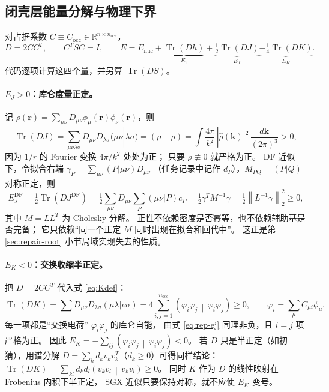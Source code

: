 \documentclass[UTF8,fontset=fandol,11pt,a4paper]{ctexart}
\numberwithin{equation}{section}
\newcommand{\Tr}{\operatorname{Tr}}
\newcommand{\norm}[1]{\left\lVert #1\right\rVert}
\newcommand{\inner}[2]{\left(#1\,\middle|\,#2\right)}
\begin{document}
\subsection{闭壳层能量分解与物理下界}
\label{sec:repair-energy}
对占据系数 \(C\equiv C_{\mathrm{occ}}\in\mathbb R^{n\times n_{\mathrm{occ}}}\)，
\begin{equation}
D=2CC^T,\qquad C^TSC=I,\qquad
E=E_{\mathrm{nuc}}+\underbrace{\Tr(Dh)}_{E_1}
+\underbrace{\tfrac12\Tr(DJ)}_{E_J}
\underbrace{-\tfrac14\Tr(DK)}_{E_K}.
\label{eq:rep-energy}
\end{equation}
代码逐项计算这四个量，并另算 \(\Tr(DS)\)。

\paragraph{\(E_J>0\)：库仑度量正定。}
记 \(\rho(\bm r)=\sum_{\mu\nu}D_{\mu\nu}\phi_\mu(\bm r)\phi_\nu(\bm r)\)，则
\begin{equation}
\Tr(DJ)=\sum_{\mu\nu\lambda\sigma}D_{\mu\nu}D_{\lambda\sigma}(\mu\nu|\lambda\sigma)
=\inner{\rho}{\rho}
=\int\frac{4\pi}{k^2}\,|\hat\rho(\bm k)|^2\,\frac{d\bm k}{(2\pi)^3}>0,
\label{eq:rep-ej}
\end{equation}
因为 \(1/r\) 的 Fourier 变换 \(4\pi/k^2\) 处处为正；
只要 \(\rho\not\equiv0\) 就严格为正。
DF 近似下，令拟合右端
\(\gamma_P=\sum_{\mu\nu}(P|\mu\nu)D_{\mu\nu}\)
（任务记录中记作 \(d_P\)），\(M_{PQ}=(P|Q)\) 对称正定，则
\begin{equation}
E_J^{\mathrm{DF}}=\tfrac12\Tr(DJ^{\mathrm{DF}})
=\tfrac12\sum_{\mu\nu}D_{\mu\nu}\sum_P(\mu\nu|P)c_P
=\tfrac12\gamma^TM^{-1}\gamma
=\tfrac12\norm{L^{-1}\gamma}_2^2\geq0,
\label{eq:rep-ejdf}
\end{equation}
其中 \(M=LL^T\) 为 Cholesky 分解。
正性不依赖密度是否幂等，也不依赖辅助基是否完备；
它只依赖“同一个正定 \(M\) 同时出现在拟合和回代中”。
这正是第 \ref{sec:repair-root} 小节局域实现失去的性质。

\paragraph{\(E_K<0\)：交换收缩半正定。}
把 \(D=2CC^T\) 代入式 \eqref{eq:Kdef}：
\begin{equation}
\Tr(DK)=\sum D_{\mu\nu}D_{\lambda\sigma}(\mu\lambda|\nu\sigma)
=4\sum_{i,j=1}^{n_{\mathrm{occ}}}
\inner{\varphi_i\varphi_j}{\varphi_i\varphi_j}\geq0,
\qquad \varphi_i=\sum_\mu C_{\mu i}\phi_\mu .
\label{eq:rep-ek}
\end{equation}
每一项都是“交换电荷” \(\varphi_i\varphi_j\) 的库仑自能，
由式 \eqref{eq:rep-ej} 同理非负，且 \(i=j\) 项严格为正。
因此 \(E_K=-\sum_{ij}\inner{\varphi_i\varphi_j}{\varphi_i\varphi_j}<0\)。
若 \(D\) 只是半正定（如初猜），用谱分解
\(D=\sum_kd_kv_kv_k^T\)（\(d_k\geq0\)）可得同样结论：
\(\Tr(DK)=\sum_{kl}d_kd_l\inner{v_kv_l}{v_kv_l}\geq0\)。
同时 \(K\) 作为 \(D\) 的线性映射在 Frobenius 内积下半正定，
SGX 近似只要保持对称，就不应使 \(E_K\) 变号。
\end{document}
